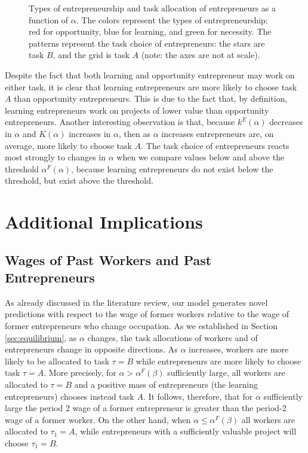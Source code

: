 \documentclass[12pt,american]{paper}
\theoremstyle{remark}
\begin{document}
\begin{figure}
\begin{tikzpicture}[thick,scale=1, every node/.style={scale=1.1}]



\end{tikzpicture}
    \caption{Types of entrepreneurship and task allocation of entrepreneurs as a function of $\alpha$. The colors represent the types of entrepreneurship: red for opportunity, blue for learning, and green for necessity. The patterns represent the task choice of entrepreneurs: the stars are task $B$, and the grid is task $A$ (note: the axes are not at scale).}
    \label{fig:types_of_entrepreneurship}
\end{figure}

Despite the fact that both learning and opportunity entrepreneur may work on either task, it is clear that learning entrepreneurs are more likely to choose task $A$ than opportunity entrepreneurs. This is due to the fact that, by definition, learning entrepreneurs work on projects of lower value than opportunity entrepreneurs. Another interesting observation is that, because $k^E(\alpha)$ decreases in $\alpha$ and $K(\alpha)$ increases in $\alpha$, then as $\alpha$ increases entrepreneurs are, on average, more likely to choose task $A$. The task choice of entrepreneurs reacts most strongly to changes in $\alpha$ when we compare values below and above the threshold $\alpha^F(\alpha)$, because learning entrepreneurs do not exist  below the threshold, but exist  above the threshold.



\section{Additional Implications}\label{sec:implications}

\subsection{Wages of Past Workers and Past Entrepreneurs}\label{sec:wages of past workers vs entrepreneurs}

As already discussed in the literature review, our model generates novel predictions with respect to the wage of former workers relative to the wage of former entrepreneurs who change occupation.  As we established in Section \ref{sec:equilibrium}, as $\alpha$ changes, the task allocations of workers and of entrepreneurs change in opposite directions. As $\alpha$ increases, workers are more likely to be allocated to task $\tau=B$ while entrepreneurs are more likely to choose task $\tau=A$.  More precisely, for $\alpha>\alpha^F(\beta)$ sufficiently large,  all workers are allocated to $\tau=B$ and a positive mass of entrepreneurs (the learning entrepreneurs) chooses instead task $A$. It follows, therefore, that for $\alpha$ sufficiently large the period 2 wage of a former entrepreneur is greater than the period-2 wage of a former worker. On the other hand, when $\alpha\leq \alpha^F(\beta)$ all workers are allocated to $\tau_1=A$, while entrepreneurs with a sufficiently valuable project will choose $\tau_1=B$. 
\end{document}
